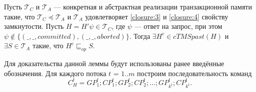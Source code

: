 \begin{lemma}\label{necessity2}
Пусть $\mathcal{T}_C$ и $\mathcal{T}_A$ --- конкретная и абстрактная реализации транзакционной памяти такие, что $\mathcal{T}_C \preceq \mathcal{T}_A$ и $\mathcal{T}_A$ удовлетворяет \ref{closure:3} и \ref{closure:4} свойству замкнутости. Пусть $H = H'\psi \in \mathcal{T}_C$, где $\psi$ --- ответ на запрос, при этом $\psi \notin \{(\_,\_,committed),(\_,\_,aborted)\}$. Тогда $\exists H^c \in cTMSpast(H)$ и $\exists S \in \mathcal{T}_A$ такие, что $H^c \sqsubseteq_{op} S$.
\end{lemma}
\begin{myproof}
Для доказательства данной леммы будут использованы ранее введённые обозначения. Для каждого потока $t$ = $1..m$ построим последовательность команд $$C^t_H = GP^t_1;CP^t_1;GP^t_2;CP^t_2;\ldots;GP^t_{k^t};CP^t_{k^t}.$$


\end{myproof}
